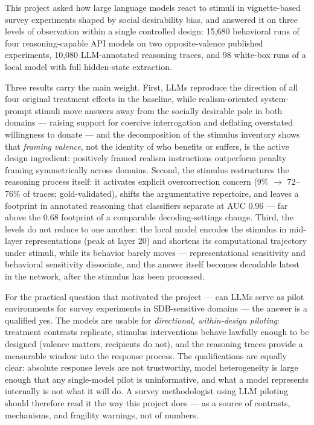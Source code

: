 \documentclass[14pt,a4paper]{extarticle}
\begin{document}
This project asked how large language models react to stimuli in vignette-based survey experiments shaped by social desirability bias, and answered it on three levels of observation within a single controlled design: 15{,}680 behavioral runs of four reasoning-capable API models on two opposite-valence published experiments, 10{,}080 LLM-annotated reasoning traces, and 98 white-box runs of a local model with full hidden-state extraction.

Three results carry the main weight. First, LLMs reproduce the direction of all four original treatment effects in the baseline, while realism-oriented system-prompt stimuli move answers away from the socially desirable pole in both domains --- raising support for coercive interrogation and deflating overstated willingness to donate --- and the decomposition of the stimulus inventory shows that \emph{framing valence}, not the identity of who benefits or suffers, is the active design ingredient: positively framed realism instructions outperform penalty framing symmetrically across domains. Second, the stimulus restructures the reasoning process itself: it activates explicit overcorrection concern (9\% $\to$ 72--76\% of traces; gold-validated), shifts the argumentative repertoire, and leaves a footprint in annotated reasoning that classifiers separate at AUC 0.96 --- far above the 0.68 footprint of a comparable decoding-settings change. Third, the levels do not reduce to one another: the local model encodes the stimulus in mid-layer representations (peak at layer 20) and shortens its computational trajectory under stimuli, while its behavior barely moves --- representational sensitivity and behavioral sensitivity dissociate, and the answer itself becomes decodable latest in the network, after the stimulus has been processed.

For the practical question that motivated the project --- can LLMs serve as pilot environments for survey experiments in SDB-sensitive domains --- the answer is a qualified yes. The models are usable for \emph{directional, within-design piloting}: treatment contrasts replicate, stimulus interventions behave lawfully enough to be designed (valence matters, recipients do not), and the reasoning traces provide a measurable window into the response process. The qualifications are equally clear: absolute response levels are not trustworthy, model heterogeneity is large enough that any single-model pilot is uninformative, and what a model represents internally is not what it will do. A survey methodologist using LLM piloting should therefore read it the way this project does --- as a source of contrasts, mechanisms, and fragility warnings, not of numbers.
\end{document}
